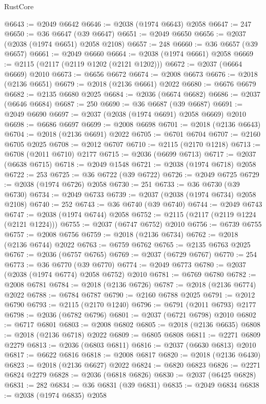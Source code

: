 \begin{lexlean}{RustCore}
\begin{coremodule}
@6643 := @2049 @6642
@6646 := @2038 (@1974 @6643) @2058
@6647 := 247
@6650 := @36 @6647 (@39 @6647)
@6651 := @2049 @6650
@6656 := @2037 (@2038 (@1974 @6651) @2058 @2108)
@6657 := 248
@6660 := @36 @6657 (@39 @6657)
@6661 := @2049 @6660
@6664 := @2038 (@1974 @6661) @2058
@6669 := @2115 (@2117 (@2119 @1202 (@2121 @1202)))
@6672 := @2037 (@6664 @6669) @2010
@6673 := @6656 @6672
@6674 := @2008 @6673
@6676 := @2018 (@2136 @6651)
@6679 := @2018 (@2136 @6661) @2022
@6680 := @6676 @6679
@6682 := @2135 @6680 @2025
@6684 := @2036 (@6674 @6682)
@6686 := @2037 (@6646 @6684)
@6687 := 250
@6690 := @36 @6687 (@39 @6687)
@6691 := @2049 @6690
@6697 := @2037 (@2038 (@1974 @6691) @2058 @6669) @2010
@6698 := @6686 @6697
@6699 := @2008 @6698
@6701 := @2018 (@2136 @6643)
@6704 := @2018 (@2136 @6691) @2022
@6705 := @6701 @6704
@6707 := @2160 @6705 @2025
@6708 := @2012 @6707
@6710 := @2115 (@2170 @1218)
@6713 := @6708 (@2011 @6710) @2177
@6715 := @2036 (@6699 @6713)
@6717 := @2037 (@6638 @6715)
@6718 := @2049 @1548
@6721 := @2038 (@1974 @6718) @2058
@6722 := 253
@6725 := @36 @6722 (@39 @6722)
@6726 := @2049 @6725
@6729 := @2038 (@1974 @6726) @2058
@6730 := 251
@6733 := @36 @6730 (@39 @6730)
@6734 := @2049 @6733
@6739 := @2037 (@2038 (@1974 @6734) @2058 @2108)
@6740 := 252
@6743 := @36 @6740 (@39 @6740)
@6744 := @2049 @6743
@6747 := @2038 (@1974 @6744) @2058
@6752 := @2115 (@2117 (@2119 @1224 (@2121 @1224)))
@6755 := @2037 (@6747 @6752) @2010
@6756 := @6739 @6755
@6757 := @2008 @6756
@6759 := @2018 (@2136 @6734)
@6762 := @2018 (@2136 @6744) @2022
@6763 := @6759 @6762
@6765 := @2135 @6763 @2025
@6767 := @2036 (@6757 @6765)
@6769 := @2037 (@6729 @6767)
@6770 := 254
@6773 := @36 @6770 (@39 @6770)
@6774 := @2049 @6773
@6780 := @2037 (@2038 (@1974 @6774) @2058 @6752) @2010
@6781 := @6769 @6780
@6782 := @2008 @6781
@6784 := @2018 (@2136 @6726)
@6787 := @2018 (@2136 @6774) @2022
@6788 := @6784 @6787
@6790 := @2160 @6788 @2025
@6791 := @2012 @6790
@6793 := @2115 (@2170 @1240)
@6796 := @6791 (@2011 @6793) @2177
@6798 := @2036 (@6782 @6796)
@6801 := @2037 (@6721 @6798) @2010
@6802 := @6717 @6801
@6803 := @2008 @6802
@6805 := @2018 (@2136 @6635)
@6808 := @2018 (@2136 @6718) @2022
@6809 := @6805 @6808
@6811 := @2271 @6809 @2279
@6813 := @2036 (@6803 @6811)
@6816 := @2037 (@6630 @6813) @2010
@6817 := @6622 @6816
@6818 := @2008 @6817
@6820 := @2018 (@2136 @6430)
@6823 := @2018 (@2136 @6627) @2022
@6824 := @6820 @6823
@6826 := @2271 @6824 @2279
@6828 := @2036 (@6818 @6826)
@6830 := @2037 (@6425 @6828)
@6831 := 282
@6834 := @36 @6831 (@39 @6831)
@6835 := @2049 @6834
@6838 := @2038 (@1974 @6835) @2058

\end{coremodule}
\end{lexlean}
